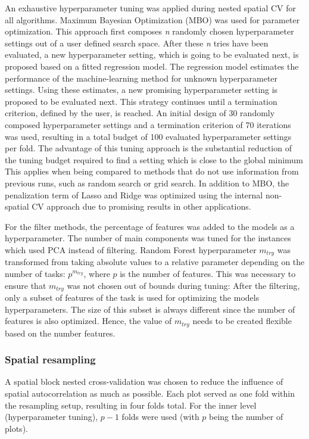 \documentclass[letterpaper, peerreview]{IEEEtran}
\begin{document}
\noindent An exhaustive hyperparameter tuning was applied during nested spatial \ac{CV} for all algorithms.
Maximum Bayesian Optimization\cite{mlrmbo} (MBO) was used for parameter optimization.
This approach first composes \textit{n} randomly chosen hyperparameter settings out of a user defined search space.
After these \textit{n} tries have been evaluated, a new hyperparameter setting, which is going to be evaluated next, is proposed based on a fitted regression model.
The regression model estimates the performance of the machine-learning method for unknown hyperparameter settings.
Using these estimates, a new promising hyperparameter setting is proposed to be evaluated next.
This strategy continues until a termination criterion, defined by the user, is reached\cite{hutter2011, jones1998}.
An initial design of 30 randomly composed hyperparameter settings and a termination criterion of 70 iterations was used, resulting in a total budget of 100 evaluated hyperparameter settings per fold.
The advantage of this tuning approach is the substantial reduction of the tuning budget required to find a setting which is close to the global minimum
This applies when being compared to methods that do not use information from previous runs, such as random search or grid search\cite{bergstra2012}.
In addition to MBO, the penalization term of Lasso and Ridge was optimized using the internal non-spatial CV approach due to promising results in other applications.

For the filter methods, the percentage of features was added to the models as a hyperparameter.
The number of main components was tuned for the instances which used \ac{PCA} instead of filtering.
Random Forest hyperparameter \texttt{\(m_{try}\)} was transformed from taking absolute values to a relative parameter depending on the number of tasks: \(p^{m_{try}}\), where \(p\) is the number of features.
This was necessary to ensure that \texttt{\(m_{try}\)} was not chosen out of bounds during tuning:
After the filtering, only a subset of features of the task is used for optimizing the models hyperparameters.
The size of this subset is always different since the number of features is also optimized.
Hence, the value of  \texttt{\(m_{try}\)} needs to be created flexible based on the number features.

\subsubsection{Spatial resampling}

\noindent A spatial block nested cross-validation was chosen to reduce the influence of spatial autocorrelation as much as possible\cite{schratz2019, sperrorest}.
Each plot served as one fold within the resampling setup, resulting in four folds total.
For the inner level (hyperparameter tuning), \(p - 1\) folds were used (with \(p\) being the number of plots).
\end{document}
